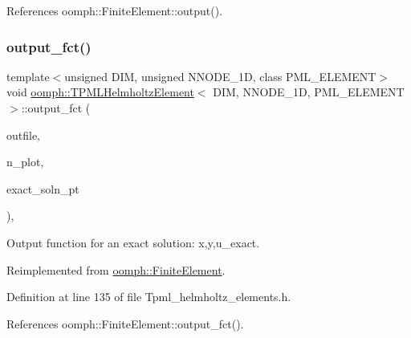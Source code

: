 References oomph\+::\+Finite\+Element\+::output().

\mbox{\label{classoomph_1_1TPMLHelmholtzElement_ad16e9353adb16154f2518ba37269d402}} 
\subsubsection{\texorpdfstring{output\+\_\+fct()}{output\_fct()}\hspace{0.1cm}{\footnotesize\ttfamily [1/2]}}
{\footnotesize\ttfamily template$<$unsigned D\+IM, unsigned N\+N\+O\+D\+E\+\_\+1D, class P\+M\+L\+\_\+\+E\+L\+E\+M\+E\+NT$>$ \\
void \hyperlink{classoomph_1_1TPMLHelmholtzElement}{oomph\+::\+T\+P\+M\+L\+Helmholtz\+Element}$<$ D\+IM, N\+N\+O\+D\+E\+\_\+1D, P\+M\+L\+\_\+\+E\+L\+E\+M\+E\+NT $>$\+::output\+\_\+fct (\begin{DoxyParamCaption}\item[{std\+::ostream \&}]{outfile,  }\item[{const unsigned \&}]{n\+\_\+plot,  }\item[{\hyperlink{classoomph_1_1FiniteElement_a690fd33af26cc3e84f39bba6d5a85202}{Finite\+Element\+::\+Steady\+Exact\+Solution\+Fct\+Pt}}]{exact\+\_\+soln\+\_\+pt }\end{DoxyParamCaption})\hspace{0.3cm}{\ttfamily [inline]}, {\ttfamily [virtual]}}



Output function for an exact solution\+: x,y,u\+\_\+exact. 



Reimplemented from \hyperlink{classoomph_1_1FiniteElement_a22b695c714f60ee6cd145be348042035}{oomph\+::\+Finite\+Element}.



Definition at line 135 of file Tpml\+\_\+helmholtz\+\_\+elements.\+h.



References oomph\+::\+Finite\+Element\+::output\+\_\+fct().

\mbox{\label{classoomph_1_1TPMLHelmholtzElement_a6484704096ebd1938d584c8059f9ba7d}} 

